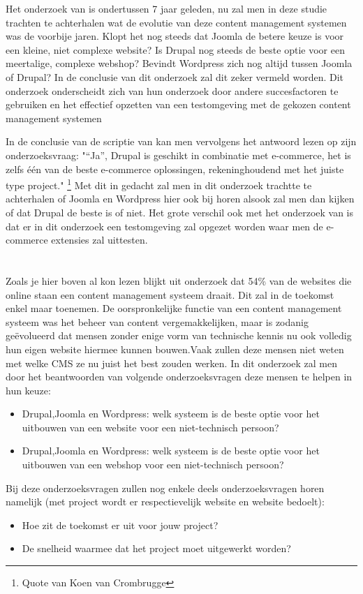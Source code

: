 Het onderzoek van \textcite{Patel2011} is ondertussen 7 jaar geleden, nu zal men in deze studie trachten te achterhalen wat de evolutie van deze content management systemen was de voorbije jaren. Klopt het nog steeds dat Joomla de betere keuze is voor een kleine, niet complexe website? Is Drupal nog steeds de beste optie voor een meertalige, complexe webshop? Bevindt Wordpress zich nog altijd tussen Joomla of Drupal? In de conclusie van dit onderzoek zal dit zeker vermeld worden. Dit onderzoek onderscheidt zich van \textcite{Patel2011} hun onderzoek door andere succesfactoren te gebruiken en het effectief opzetten van een testomgeving met de gekozen content management systemen

In de conclusie van de scriptie van \textcite{Crombrugge2015} kan men vervolgens het antwoord lezen op zijn onderzoeksvraag: "“Ja”, Drupal is geschikt in combinatie met e-commerce, het is zelfs één van de beste e-commerce oplossingen, rekeninghoudend met het juiste type project." \footnote{Quote van Koen van Crombrugge}\parencite{Crombrugge2015} Met dit in gedacht zal men in dit onderzoek trachtte te achterhalen of Joomla en Wordpress hier ook bij horen alsook zal men dan kijken of dat Drupal de beste is of niet. Het grote verschil ook met het onderzoek van \textcite{Crombrugge2015} is dat er in dit onderzoek een testomgeving zal  opgezet worden waar men de e-commerce extensies zal uittesten.

\section{}
\label{sec:onderzoeksvraag}

Zoals je hier boven al kon lezen blijkt uit onderzoek dat 54\% van de websites die online staan een content management systeem draait. Dit zal in de toekomst enkel maar toenemen. De oorspronkelijke functie van een content management systeem was het beheer van content vergemakkelijken, maar is zodanig geëvolueerd dat mensen zonder enige vorm van technische kennis nu ook volledig hun eigen website hiermee kunnen bouwen.Vaak zullen deze mensen niet weten met welke CMS ze nu juist het best zouden werken. In dit onderzoek zal men door het beantwoorden van volgende onderzoeksvragen deze mensen te helpen in hun keuze:
\begin{itemize}
	\item Drupal,Joomla en Wordpress: welk systeem is de beste optie voor het uitbouwen van een website voor een niet-technisch persoon?
	\item Drupal,Joomla en Wordpress: welk systeem is de beste optie voor het uitbouwen van een webshop voor een niet-technisch persoon?
\end{itemize}
Bij deze onderzoeksvragen zullen nog enkele deels onderzoeksvragen horen namelijk (met project wordt er respectievelijk website en website bedoelt):
\begin{itemize}
    \item Hoe zit de toekomst er uit voor jouw project?
    \item De snelheid waarmee dat het project moet uitgewerkt worden?
\end{itemize}

